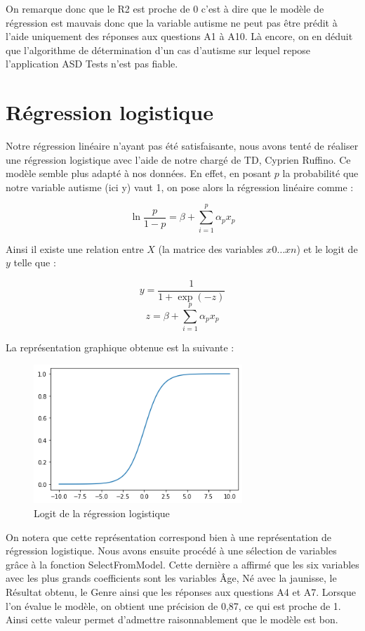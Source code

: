 \documentclass[12,french]{report}
\begin{document}
On remarque donc que le R2 est proche de 0 c’est à dire que le modèle de régression est mauvais donc que la variable autisme ne peut pas être prédit à l’aide uniquement des réponses aux questions A1 à A10. Là encore, on en déduit que l’algorithme de détermination d’un cas d’autisme sur lequel repose l’application ASD Tests n’est pas fiable.



\chapter{Régression logistique}
Notre régression linéaire n’ayant pas été satisfaisante, nous avons tenté de réaliser une régression logistique avec l’aide de notre chargé de TD, Cyprien Ruffino. Ce modèle semble plus adapté à nos données. En effet, en posant $p$ la probabilité que notre variable autisme (ici y) vaut 1, on pose alors la régression linéaire comme :

$$ \ln\frac{p}{1-p}=\beta+\sum_{i=1}^{p}\alpha_{p}x_{p} $$

Ainsi il existe une relation entre $X$ (la matrice des variables $x0\dots xn$) et le logit de $y$ telle que :

$$y=\frac{1}{1+\exp(-z)}$$
$$z=\beta+\sum_{i=1}^{p}\alpha_{p}x_{p} $$

La représentation graphique obtenue est la suivante : \\

\begin{figure}[H]
	\center
	\includegraphics[width=0.7\textwidth]{./Images/23}
	\caption{Logit de la régression logistique}
\end{figure}\vspace{0.1cm}

On notera que cette représentation correspond bien à une représentation de régression logistique. Nous avons ensuite procédé à une sélection de variables grâce à la fonction SelectFromModel. Cette dernière a affirmé que les six variables avec les plus grands coefficients sont les variables Âge, Né avec la jaunisse, le Résultat obtenu, le Genre ainsi que les réponses aux questions A4 et A7. Lorsque l’on évalue le modèle, on obtient une précision de 0,87, ce qui est proche de 1. Ainsi cette valeur permet d’admettre raisonnablement que le modèle est bon.
\end{document}
